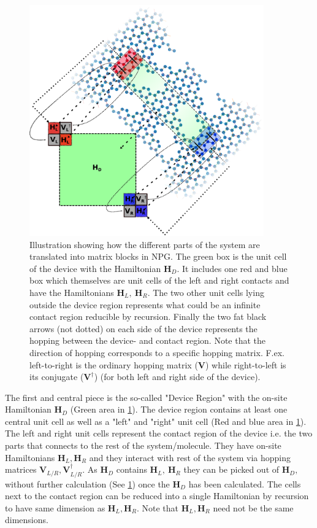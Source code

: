 \begin{figure}
    \centering 
    \includegraphics[width=0.9\textwidth]{Figures/illu.eps}
    \caption{Illustration showing how the different parts of the system are translated into matrix blocks in NPG. The green box is the unit cell of the device with the Hamiltonian \(\textbf{H}_D\). It includes one red and blue box which themselves are unit cells of the left and right contacts and have the Hamiltonians \(\textbf{H}_L,\ \textbf{H}_R\). The two other unit cells lying outside the device region represents what could be an infinite contact region reducible by recursion. Finally the two fat black arrows (not dotted) on each side of the device represents the hopping between the device- and contact region. Note that the direction of hopping corresponds to a specific hopping matrix. F.ex. left-to-right is the ordinary hopping matrix (\(\mathbf{V}\)) while right-to-left is its conjugate (\(\mathbf{V}^{\dagger}\)) (for both left and right side of the device).}
    \label{systemillu}
\end{figure}
The first and central piece is the so-called "Device Region" with the on-site Hamiltonian \(\mathbf{H}_D\) (Green area in \cref{systemillu}). The device region contains at least one central unit cell as well as a "left" and "right" unit cell (Red and blue area in \cref{systemillu}). The left and right unit cells represent the contact region of the device i.e. the two parts that connects to the rest of the system/molecule. They have on-site Hamiltonians \(\mathbf{H}_L,\mathbf{H}_R\) and they interact with rest of the system via hopping matrices \(\mathbf{V}_{L/R},\mathbf{V}^{\dagger}_{L/R}\). As \(\textbf{H}_D\) contains \(\textbf{H}_L,\ \textbf{H}_R\) they can be picked out of \(\textbf{H}_D, \)  without further calculation (See \cref{systemillu}) once the \(\mathbf{H}_D\) has been calculated. The cells next to the contact region can be reduced into a single Hamiltonian by recursion to have same dimension as \(\mathbf{H}_L,\mathbf{H}_R\). Note that \(\mathbf{H}_L,\mathbf{H}_R\) need not be the same dimensions.
